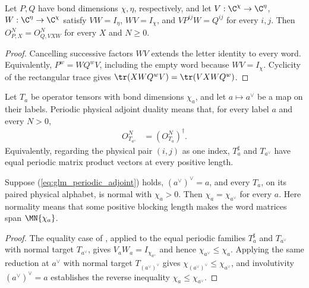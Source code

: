 \begin{lemma}
    \label{thm:glm_boundary_similarity}
    \leanok
    Let $P,Q$ have bond dimensions $\chi,\eta$, respectively, and let
    $V:\C^\chi\to\C^\eta$, $W:\C^\eta\to\C^\chi$ satisfy
    $VW=I_\eta$, $WV=I_\chi$, and $VP^{ij}W=Q^{ij}$ for every $i,j$.
    Then $O^N_{P,X}=O^N_{Q,VXW}$ for every $X$ and $N\geq0$.
\end{lemma}
\begin{proof}\leanok
    Cancelling successive factors $WV$ extends the letter identity to
    every word. Equivalently, $P^w=WQ^wV$, including the empty word
    because $WV=I_\chi$. Cyclicity of the rectangular trace gives
    $\tr(XWQ^wV)=\tr(VXWQ^w)$.
\end{proof}

\begin{definition}
    \label{def:glm_periodic_adjoint_family}
    \leanok
    Let $T_a$ be operator tensors with bond dimensions $\chi_a$, and
    let $a\mapsto a^\vee$ be a map on their labels. Periodic physical
    adjoint duality means that, for every label $a$ and every $N>0$,
    \begin{align}
        O^N_{T_{a^\vee}} & =(O^N_{T_a})^\dagger.
        \label{eq:glm_periodic_adjoint}
    \end{align}
    Equivalently, regarding the physical pair $(i,j)$ as one index,
    $T_a^\sharp$ and $T_{a^\vee}$ have equal periodic matrix product
    vectors at every positive length.
\end{definition}

\begin{lemma}
    \label{thm:glm_dual_bond_dimension}
    \leanok
    Suppose (\ref{eq:glm_periodic_adjoint}) holds,
    $(a^\vee)^\vee=a$, and every $T_a$, on its paired physical alphabet,
    is normal with $\chi_a>0$. Then $\chi_a=\chi_{a^\vee}$ for every $a$.
    Here normality means that some positive blocking length makes the
    word matrices span $\MN{\chi_a}$.
\end{lemma}
\begin{proof}\leanok
    The equality case of \cite[Proposition~20]{Molnar2018SemiInjective},
    applied to the equal periodic families $T_a^\sharp$ and $T_{a^\vee}$ with
    normal target $T_{a^\vee}$, gives $V_aW_a=I_{\chi_{a^\vee}}$ and hence
    $\chi_{a^\vee}\leq\chi_a$. Applying the same reduction at $a^\vee$ with
    normal target $T_{(a^\vee)^\vee}$ gives
    $\chi_{(a^\vee)^\vee}\leq\chi_{a^\vee}$, and involutivity
    $(a^\vee)^\vee=a$ establishes the reverse inequality
    $\chi_a\leq\chi_{a^\vee}$.
\end{proof}

